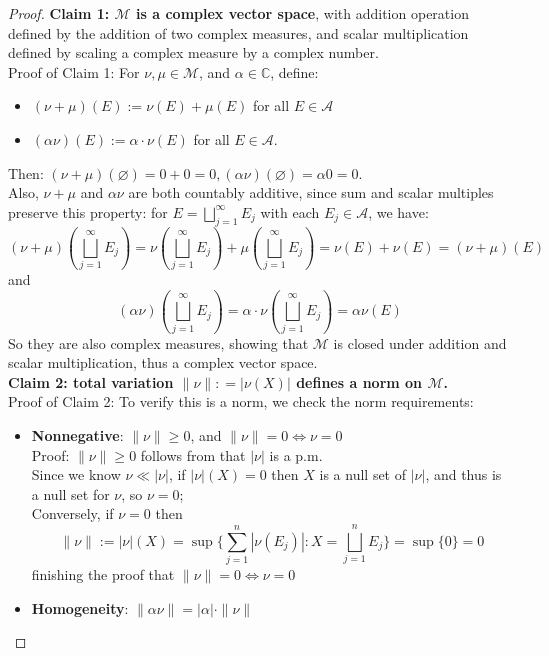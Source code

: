 \documentclass[lang=cn,11pt]{elegantbook}
\begin{document}
\begin{proof}
 \textbf{   Claim 1: $\mathcal{M}$ is a complex vector space}, with addition operation defined by the addition of two complex measures, and scalar multiplication defined by scaling a complex measure by a complex number.\\
 Proof of Claim 1: 
For $\nu, \mu \in \mathcal{M}$, and $\alpha \in \mathbb{C}$, define:
    \begin{itemize}
        \item $(\nu+\mu)(E):=\nu(E)+\mu(E)$ for all $E \in \mathcal{A}$
        \item $(\alpha \nu)(E):=\alpha \cdot \nu(E)$ for all $E \in \mathcal{A}$.
    \end{itemize}
Then: $(\nu+\mu)(\varnothing)  = 0  + 0  = 0, (\alpha \nu)(\varnothing) = \alpha 0 = 0$.\\
Also, $\nu+\mu$ and $\alpha \nu$ are both countably additive, since sum and scalar multiples preserve this property: for $E = \bigsqcup_{j=1}^\infty E_j$ with each $E_j \in \mathcal{A}$, we have:     \[
(\nu + \mu) (\bigsqcup_{j=1}^\infty E_j) = \nu  (\bigsqcup_{j=1}^\infty E_j) + \mu (\bigsqcup_{j=1}^\infty E_j) = \nu (E ) + \nu(E) = (\nu + \mu) (E)
\]and \[
(\alpha \nu)(\bigsqcup_{j=1}^\infty E_j)  = \alpha \cdot \nu(\bigsqcup_{j=1}^\infty E_j) = \alpha \nu (E)
\]So they are also complex measures, showing that $\mathcal{M}$ is closed under addition and scalar multiplication, thus a complex vector space.\\
\textbf{Claim 2: total variation $\| \nu \| : = | \nu(X)|$ defines a norm on $\mathcal{M}$.}\\
Proof of Claim 2: 
To verify this is a norm, we check the norm requirements:
\begin{itemize}
    \item  \textbf{Nonnegative}: $\|\nu\| \geq 0$, and $\|\nu\|=0 \Longleftrightarrow \nu=0$\\
Proof: $\|\nu\| \geq 0$ follows from that $|\nu|$ is a p.m.\\
Since we know $\nu \ll |\nu | $, if $ |\nu|(X) = 0$ then $X$ is a null set of $|\nu|$, and thus is a null set for $\nu$, so $\nu = 0$; \\
Conversely, if $\nu = 0$ then \[ \|\nu \| := 
|\nu|(X) =     \sup\{\sum_{j=1}^n|\nu(E_j)| :X=\bigsqcup_{j=1}^nE_j\} = \sup \{ 0 \} = 0
\]finishing the proof that $\|\nu\|=0 \Longleftrightarrow \nu=0$
    \item \textbf{Homogeneity}: $\|\alpha \nu\|=|\alpha| \cdot\|\nu\|$\\

\end{itemize}
\end{proof}
\end{document}
